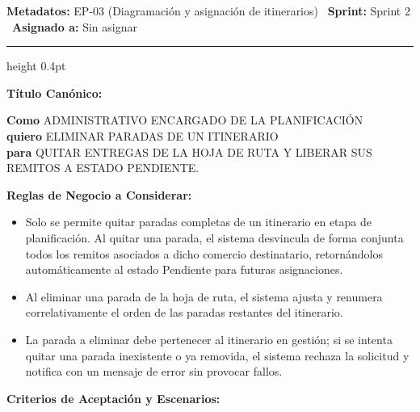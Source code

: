 \documentclass[a4paper,9pt]{article}
\begin{document}
\begin{tcolorbox}[hucard, title={\textbf{HU-47: ELIMINAR PARADAS DE UN ITINERARIO} \hfill \scriptsize \colorbox{tealstatus}{\textbf{\ Accepted\ }} \quad \colorbox{white}{\textcolor{primarydark}{\textbf{\ 3 pts\ }}}}]
\vspace{-1pt}
\noindent\textbf{\footnotesize Metadatos:} EP-03 (Diagramación y asignación de itinerarios) \textbar\ \textbf{Sprint:} Sprint 2 \textbar\ \textbf{Asignado a:} Sin asignar\par\vspace{2pt}
\hrule height 0.4pt\par\vspace{3pt}
\noindent\textbf{\footnotesize Título Canónico:}\par\vspace{1pt}
{\small \textbf{Como} ADMINISTRATIVO ENCARGADO DE LA PLANIFICACIÓN \\ \textbf{quiero} ELIMINAR PARADAS DE UN ITINERARIO \\ \textbf{para} QUITAR ENTREGAS DE LA HOJA DE RUTA Y LIBERAR SUS REMITOS A ESTADO PENDIENTE.}\par\vspace{3pt}
\noindent\textbf{\footnotesize Reglas de Negocio a Considerar:}\par\vspace{1pt}
{\footnotesize
\begin{itemize}[leftmargin=12pt, nosep, itemsep=1.5pt, topsep=1pt]
\item Solo se permite quitar paradas completas de un itinerario en etapa de planificación. Al quitar una parada, el sistema desvincula de forma conjunta todos los remitos asociados a dicho comercio destinatario, retornándolos automáticamente al estado Pendiente para futuras asignaciones.
\item Al eliminar una parada de la hoja de ruta, el sistema ajusta y renumera correlativamente el orden de las paradas restantes del itinerario.
\item La parada a eliminar debe pertenecer al itinerario en gestión; si se intenta quitar una parada inexistente o ya removida, el sistema rechaza la solicitud y notifica con un mensaje de error sin provocar fallos.
\end{itemize}
}\par\vspace{3pt}
\noindent\textbf{\footnotesize Criterios de Aceptación y Escenarios:}\par\vspace{2pt}

\end{tcolorbox}
\end{document}
